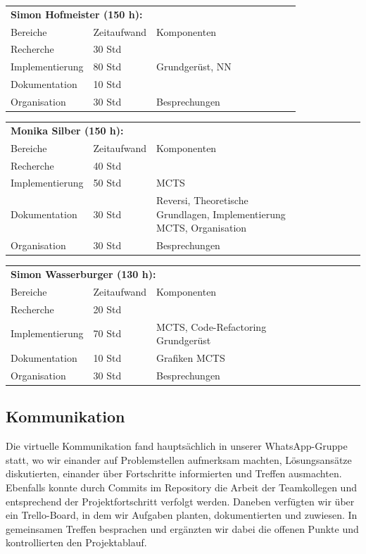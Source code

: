 \documentclass[12pt,a4paper]{article}
\begin{document}
\begin{tabular}{*{3}{p{4cm}p{3cm}p{8cm}}}
\multicolumn{3}{l}{\textbf{Simon Hofmeister (150 h):}} \\
Bereiche & Zeitaufwand & Komponenten \\
\cline{1-3}
Recherche & 30 Std &  \\
Implementierung & 80 Std & Grundgerüst, NN  \\
Dokumentation & 10 Std &   \\
Organisation & 30 Std &  Besprechungen\\
\end{tabular}


\begin{tabular}{*{3}{p{4cm}p{3cm}p{8cm}}}
\multicolumn{3}{l}{\textbf{Monika Silber (150 h):}} \\
Bereiche & Zeitaufwand & Komponenten \\
\cline{1-3}
Recherche & 40 Std &  \\
Implementierung & 50 Std & MCTS  \\
Dokumentation & 30 Std &  Reversi, Theoretische Grundlagen, Implementierung MCTS, Organisation \\
Organisation & 30 Std &  Besprechungen\\
\end{tabular}


\begin{tabular}{*{3}{p{4cm}p{3cm}p{8cm}}}
\multicolumn{3}{l}{\textbf{Simon Wasserburger (130 h):}} \\
Bereiche & Zeitaufwand & Komponenten \\
\cline{1-3}
Recherche & 20 Std &  \\
Implementierung & 70 Std & MCTS, Code-Refactoring Grundgerüst  \\
Dokumentation & 10 Std &  Grafiken MCTS \\
Organisation & 30 Std &  Besprechungen\\
\end{tabular}


\subsection{Kommunikation}
Die virtuelle Kommunikation fand hauptsächlich in unserer WhatsApp-Gruppe statt, wo wir einander auf Problemstellen aufmerksam machten, Lösungsansätze diskutierten, einander über Fortschritte informierten und Treffen ausmachten. Ebenfalls konnte durch Commits im Repository die Arbeit der Teamkollegen und entsprechend der Projektfortschritt verfolgt werden. Daneben verfügten wir über ein Trello-Board, in dem wir Aufgaben planten, dokumentierten und zuwiesen. In gemeinsamen Treffen besprachen und ergänzten wir dabei die offenen Punkte und kontrollierten den Projektablauf. 
\end{document}
